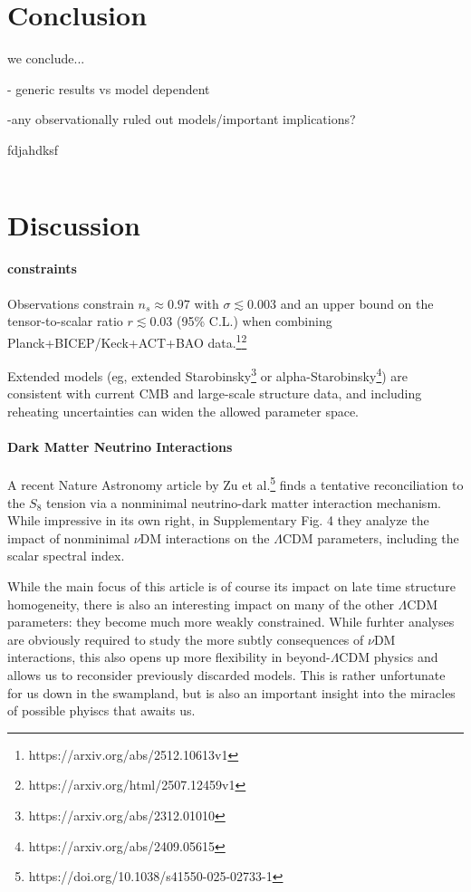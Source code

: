 \section{Conclusion}

we conclude...

- generic results vs model dependent

-any observationally ruled out models/important implications?



fdjahdksf

\[\]


\section{Discussion}

\paragraph{constraints}
Observations constrain $n_s \approx 0.97$ with $\sigma \lesssim 0.003$ and an upper bound on the tensor-to-scalar ratio $r \lesssim 0.03$ (95\% C.L.) when combining Planck+BICEP/Keck+ACT+BAO data.\footnote{https://arxiv.org/abs/2512.10613v1}\footnote{https://arxiv.org/html/2507.12459v1}


Extended models (eg, extended Starobinsky\footnote{https://arxiv.org/abs/2312.01010} or alpha-Starobinsky\footnote{https://arxiv.org/abs/2409.05615}) are consistent with current CMB and large-scale structure data, and including reheating uncertainties can widen the allowed parameter space.




\paragraph{Dark Matter Neutrino Interactions}

A recent Nature Astronomy article by Zu et al.\footnote{https://doi.org/10.1038/s41550-025-02733-1} finds a tentative reconciliation to the $S_8$ tension via a nonminimal neutrino-dark matter interaction mechanism. While impressive in its own right, in Supplementary Fig. 4 they analyze the impact of nonminimal $\nu$DM interactions on the $\Lambda$CDM parameters, including the scalar spectral index. 

While the main focus of this article is of course its impact on late time structure homogeneity, there is also an interesting impact on many of the other $\Lambda$CDM parameters: they become much more weakly constrained. While furhter analyses are obviously required to study the more subtly consequences of $\nu$DM interactions, this also opens up more flexibility in beyond-$\Lambda$CDM physics and allows us to reconsider previously discarded models. This is rather unfortunate for us down in the swampland, but is also an important insight into the miracles of possible phyiscs that awaits us.


